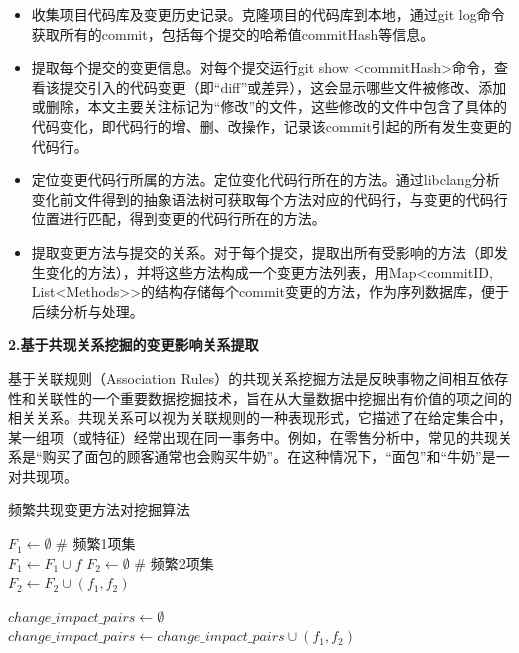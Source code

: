 \begin{itemize}
    \item 收集项目代码库及变更历史记录。克隆项目的代码库到本地，通过git log命令获取所有的commit，包括每个提交的哈希值commitHash等信息。
    \item 提取每个提交的变更信息。对每个提交运行git show <commitHash>命令，查看该提交引入的代码变更（即“diff”或差异），这会显示哪些文件被修改、添加或删除，本文主要关注标记为“修改”的文件，这些修改的文件中包含了具体的代码变化，即代码行的增、删、改操作，记录该commit引起的所有发生变更的代码行。
    \item 定位变更代码行所属的方法。定位变化代码行所在的方法。通过libclang分析变化前文件得到的抽象语法树可获取每个方法对应的代码行，与变更的代码行位置进行匹配，得到变更的代码行所在的方法。
    \item 提取变更方法与提交的关系。对于每个提交，提取出所有受影响的方法（即发生变化的方法），并将这些方法构成一个变更方法列表，用Map<commitID, List<Methods>>的结构存储每个commit变更的方法，作为序列数据库，便于后续分析与处理。
    
\end{itemize}

\noindent \textbf{2.基于共现关系挖掘的变更影响关系提取}

基于关联规则（Association Rules）的共现关系挖掘方法是反映事物之间相互依存性和关联性的一个重要数据挖掘技术，旨在从大量数据中挖掘出有价值的项之间的相关关系。共现关系可以视为关联规则的一种表现形式，它描述了在给定集合中，某一组项（或特征）经常出现在同一事务中。例如，在零售分析中，常见的共现关系是“购买了面包的顾客通常也会购买牛奶”。在这种情况下，“面包”和“牛奶”是一对共现项。

\begin{algorithm}[h]
    \caption{频繁共现变更方法对挖掘算法}
    \label{同时变更方法对挖掘算法}
     $F_1 \gets \emptyset$  \# 频繁1项集\\  
     {
         {
            $F_1 \gets F_1 \cup f$
        }
    } 
    $F_2 \gets \emptyset$  \# 频繁2项集\\ 
     {
         {
            $F_2 \gets F_2 \cup (f_1, f_2)$
        }
    }
    
    $change\_impact\_pairs \gets \emptyset$ \\ 
     {
         {
            $change\_impact\_pairs \gets change\_impact\_pairs \cup (f_1, f_2)$
        }
    }
    \end{algorithm}


